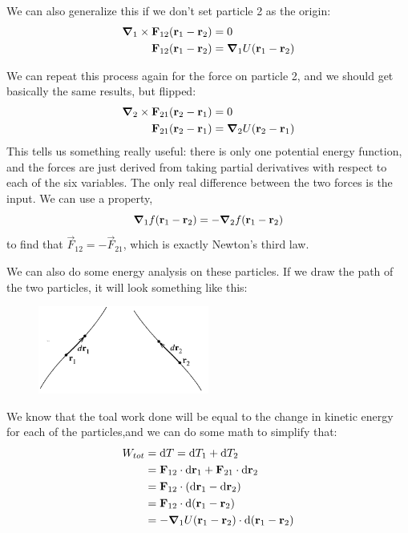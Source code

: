 \documentclass[a4paper]{article}
\begin{document}
We can also generalize this if we don't set particle 2 as the origin:
\begin{align*}
	\boldsymbol{\mathbf{\nabla}}_1\times\boldsymbol{\mathbf{F}}_{12}(\boldsymbol{\mathbf{r}}_1-\boldsymbol{\mathbf{r}}_2) &= 0\\
	\boldsymbol{\mathbf{F}}_{12}(\boldsymbol{\mathbf{r}}_1-\boldsymbol{\mathbf{r}}_2)&=\boldsymbol{\mathbf{\nabla}}_1U(\boldsymbol{\mathbf{r}}_1-\boldsymbol{\mathbf{r}}_2)
\end{align*}

We can repeat this process again for the force on particle 2, and we
should get basically the same results, but flipped:
\begin{align*}
	\boldsymbol{\mathbf{\nabla}}_2\times\boldsymbol{\mathbf{F}}_{21}(\boldsymbol{\mathbf{r}}_2-\boldsymbol{\mathbf{r}}_1) &= 0\\
	\boldsymbol{\mathbf{F}}_{21}(\boldsymbol{\mathbf{r}}_2-\boldsymbol{\mathbf{r}}_1)&=\boldsymbol{\mathbf{\nabla}}_2U(\boldsymbol{\mathbf{r}}_2-\boldsymbol{\mathbf{r}}_1)
\end{align*}
This tells us something really useful: there is only one potential energy
function, and the forces are just derived from taking partial derivatives
with respect to each of the six variables.
The only real difference between the two forces is the input. We can use
a property,
\[
	\boldsymbol{\mathbf{\nabla}}_1f(\boldsymbol{\mathbf{r}}_1-\boldsymbol{\mathbf{r}}_2) =-\boldsymbol{\mathbf{\nabla}}_2f(\boldsymbol{\mathbf{r}}_1-\boldsymbol{\mathbf{r}}_2)
\]
to find that $\vec{F}_{12} = -\vec{F}_{21}$, which is exactly Newton's
third law.

We can also do some energy analysis on these particles. If we draw the path of
the two particles, it will look something like this:
\begin{figure}[h!]
    \centering
    \includegraphics[width=0.5\textwidth]{CentralForcesMotion.png}
\end{figure}

We know that the toal work done will be equal to the change in kinetic energy
for each of the particles,and we can do some math to simplify that:
\begin{align*}
	W_{tot} &= \mathrm{d} T = \mathrm{d} T_1 + \mathrm{d} T_2\\
		&= \boldsymbol{\mathbf{F}}_{12}\cdot\mathrm{d}\boldsymbol{\mathbf{r}}_1+\boldsymbol{\mathbf{F}}_{21}\cdot\mathrm{d}\boldsymbol{\mathbf{r}}_2\\
		&= \boldsymbol{\mathbf{F}}_{12}\cdot(\mathrm{d}\boldsymbol{\mathbf{r}}_1-\mathrm{d}\boldsymbol{\mathbf{r}}_2)\\
		&=\boldsymbol{\mathbf{F}}_{12}\cdot\mathrm{d}(\boldsymbol{\mathbf{r}}_1-\boldsymbol{\mathbf{r}}_2)\\
		&= -\boldsymbol{\mathbf{\nabla}}_1U(\boldsymbol{\mathbf{r}}_1-\boldsymbol{\mathbf{r}}_2)\cdot\mathrm{d}(\boldsymbol{\mathbf{r}}_1-\boldsymbol{\mathbf{r}}_2)
\end{align*}
\end{document}
